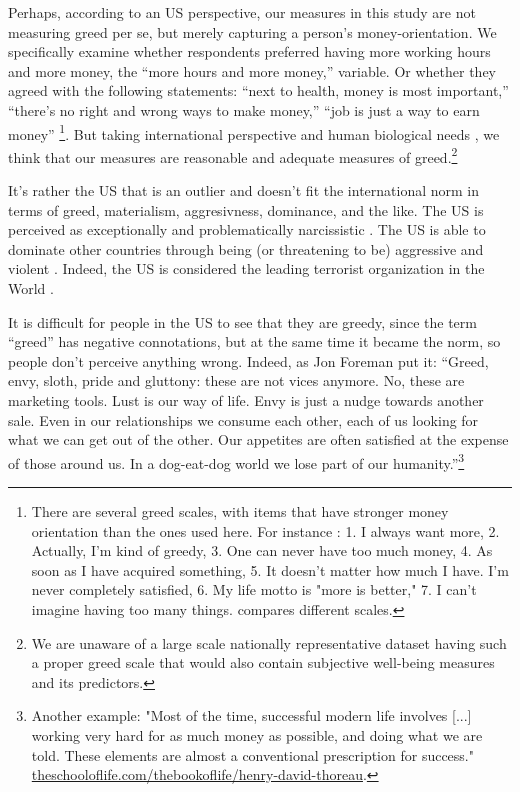 \documentclass[10pt, letterpaper]{article}
\begin{document}
\begin{spacing}{1.8}
Perhaps, according to an US perspective, our measures in this study are not measuring greed per se, but merely capturing a person's money-orientation. We specifically examine whether respondents preferred having more working hours and more money, the ``more hours and more money,'' variable. Or whether they agreed with the following statements: ``next to health, money is
most important,'' ``there's no right and wrong ways to make money,'' ``job is just a way
to earn money'' \footnote{There are several greed scales, with items that have
  stronger money orientation than the ones used here. For instance
  \citet{seuntjens15}: 1. I always want more, 2. Actually, I'm kind of greedy,
  3. One can never have too much money, 4. As soon as I have acquired something,
  5. It doesn't matter how much I have. I'm never completely satisfied, 6. My
  life motto is "more is better," 7. I can't imagine having too many things. \citet{mussel18} compares different scales.  %
}. But taking international perspective and human
biological needs  \citep[as per ][]{veenhoven14b}, we think that our measures
are reasonable and adequate measures of greed.\footnote{ We are unaware of a large scale nationally representative dataset having such a proper greed scale that would also contain subjective well-being measures and its predictors.}

It's rather the US that is an outlier and doesn't fit the international norm in terms of greed, materialism, aggresivness, dominance, and the like. 
%
The US is perceived as exceptionally and problematically narcissistic \citep{miller15}.
The US %
is able to dominate other countries through being (or threatening to be) aggressive and violent \citep[e.g.,][]{pratto08}. %
 Indeed, the US is considered the leading terrorist organization in the World
 \citep{truthout14nov3}. 

It is difficult for people in the US to see that they are greedy, since the term ``greed''
has negative connotations, but at the same time it became the norm, so people don't perceive anything wrong. Indeed, as Jon Foreman put it:
``Greed, envy, sloth, pride and gluttony: these are not vices anymore. No, these
are marketing tools. Lust is our way of life. Envy is just a nudge towards
another sale. Even in our relationships we consume each other, each of us
looking for what we can get out of the other. Our appetites are often satisfied
at the expense of those around us. In a dog-eat-dog world we lose part of our
humanity.''\footnote{Another example: "Most of the time, successful modern life involves [...] working very hard for as much money as possible, and doing what we are told. These elements are almost a conventional prescription for success." \url{theschooloflife.com/thebookoflife/henry-david-thoreau}.}


\end{spacing}
\end{document}
